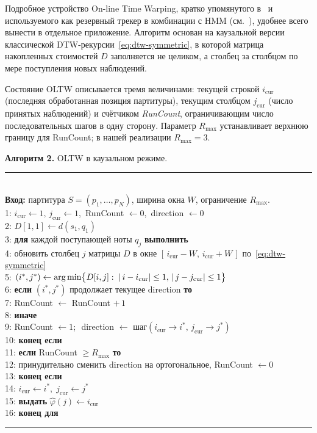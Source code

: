 %
Подробное устройство On-line Time Warping, кратко упомянутого
в~ и используемого как резервный трекер в
комбинации с HMM (см.~), удобнее всего
вынести в отдельное приложение. Алгоритм основан на каузальной
версии классической DTW-рекурсии~\eqref{eq:dtw-symmetric}, в
которой матрица накопленных стоимостей
$D$ заполняется не целиком, а столбец за столбцом по мере поступления
новых наблюдений.

Состояние OLTW описывается тремя величинами: текущей строкой
$i_{\text{cur}}$ (последняя обработанная позиция партитуры), текущим
столбцом $j_{\text{cur}}$ (число принятых наблюдений) и счётчиком
\textit{RunCount}, ограничивающим число последовательных шагов в одну
сторону. Параметр $R_{\max}$ устанавливает верхнюю границу для
RunCount; в нашей реализации $R_{\max}=3$.

\par\addvspace{2pt}
{\centering
\begin{minipage}{0.97\linewidth}
\footnotesize
\textbf{Алгоритм 2.} OLTW в каузальном режиме. \\[1pt]
\rule{\linewidth}{0.4pt}\vspace{1pt}\\
\textbf{Вход:} партитура $S=(p_1,\dots,p_N)$, ширина окна $W$,
ограничение $R_{\max}$. \\
1: $i_{\text{cur}}\gets 1,\,j_{\text{cur}}\gets 1$,
   \,RunCount $\gets 0$, \,direction $\gets 0$ \\
2: $D[1,1]\gets d(s_1,q_1)$ \\
3: \textbf{для} каждой поступающей ноты $q_j$ \textbf{выполнить} \\
4: \quad обновить столбец $j$ матрицы $D$ в окне
   $[\,i_{\text{cur}}-W,\,i_{\text{cur}}+W\,]$
   по~\eqref{eq:dtw-symmetric} \\
5: \quad $(i^*,j^*)\gets\operatorname*{arg\,min}\bigl\{D[i,j]:
   \;|\,i-i_{\text{cur}}|\le 1,\,|\,j-j_{\text{cur}}|\le 1\bigr\}$ \\
6: \quad \textbf{если} $(i^*,j^*)$ продолжает текущее
   direction \textbf{то} \\
7: \quad\quad RunCount $\gets$ RunCount $+\,1$ \\
8: \quad \textbf{иначе} \\
9: \quad\quad RunCount $\gets 1$;\,\, direction $\gets$
   шаг$(i_{\text{cur}}\!\to\!i^*,\,j_{\text{cur}}\!\to\!j^*)$ \\
10: \quad \textbf{конец если} \\
11: \quad \textbf{если} RunCount $\ge R_{\max}$ \textbf{то} \\
12: \quad\quad принудительно сменить direction
   на ортогональное, RunCount $\gets 0$ \\
13: \quad \textbf{конец если} \\
14: \quad $i_{\text{cur}}\gets i^*,\;j_{\text{cur}}\gets j^*$ \\
15: \quad \textbf{выдать} $\hat\varphi(j)\gets i_{\text{cur}}$ \\
16: \textbf{конец для} \\
\rule{\linewidth}{0.4pt}
\end{minipage}\par}
\addvspace{4pt}

